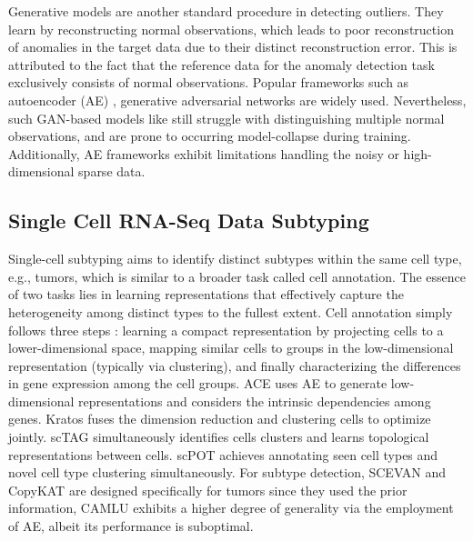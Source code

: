 \documentclass{article}
\begin{document}
Generative models are another standard procedure in detecting outliers. They learn by 
reconstructing normal observations, which leads to poor reconstruction of anomalies in 
the target data due to their distinct reconstruction error. This is attributed to the 
fact that the reference data for the anomaly detection task exclusively consists of 
normal observations.
Popular frameworks such as autoencoder (AE) \cite{odae}, generative adversarial 
networks \cite{GANad} are widely used. Nevertheless, such GAN-based 
models like \cite{EffGAN} still struggle with distinguishing multiple normal observations, and are prone to 
occurring model-collapse during training. Additionally, AE frameworks exhibit limitations 
handling the noisy or high-dimensional sparse data.
\subsection{Single Cell RNA-Seq Data Subtyping}
Single-cell subtyping aims to identify distinct subtypes within the same cell type, e.g., 
tumors, which is similar to a broader task called cell annotation. The essence of two 
tasks lies in learning representations that effectively capture the heterogeneity among 
distinct types to the fullest extent. Cell annotation simply follows three 
steps \cite{threestep}: learning a compact representation by projecting cells to a 
lower-dimensional space, mapping similar cells to groups in the low-dimensional 
representation (typically via clustering), and finally characterizing the differences in 
gene expression among the cell groups. ACE \cite{ACE} uses AE to generate 
low-dimensional representations and considers the intrinsic dependencies among genes. 
Kratos \cite{kratos} fuses the dimension reduction and clustering cells to 
optimize jointly. scTAG \cite{scTAG} simultaneously identifies cells clusters and 
learns topological representations between cells. scPOT \cite{scPOT} achieves 
annotating seen cell types and novel cell type clustering simultaneously. For subtype 
detection, SCEVAN \cite{SCEVAN} and CopyKAT \cite{CopyKAT} are designed 
specifically for tumors since they used the prior information, CAMLU \cite{CAMLU} 
exhibits a higher degree of generality via the employment of AE, albeit its performance is suboptimal. 
\end{document}
